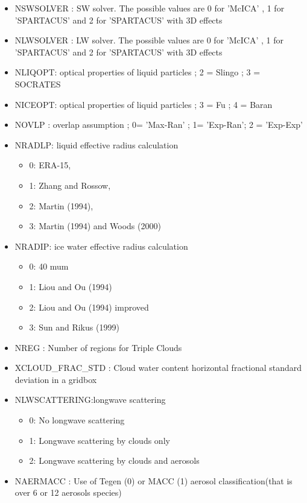 \begin{itemize}
\item NSWSOLVER : SW solver. The possible values are 0 for 'McICA' , 1 for 'SPARTACUS' and 2 for 'SPARTACUS' with 3D effects
\item NLWSOLVER : LW solver. The possible values are 0 for 'McICA' , 1 for 'SPARTACUS' and 2 for 'SPARTACUS' with 3D effects
\item NLIQOPT: optical properties of liquid particles ; 2 = Slingo ; 3 = SOCRATES
\item NICEOPT: optical properties of liquid particles ; 3 = Fu ; 4 = Baran
\item NOVLP :  overlap assumption ; 0= 'Max-Ran' ; 1= 'Exp-Ran'; 2 = 'Exp-Exp'
\item NRADLP: liquid effective radius calculation
	\begin{itemize}
		\item 0: ERA-15, 
		\item 1: Zhang and Rossow,
		\item 2: Martin (1994), 
		\item 3: Martin (1994) and Woods (2000)
	\end{itemize}
\item NRADIP: ice water effective radius calculation
	\begin{itemize}
		\item 0: 40 mum
		\item 1: Liou and Ou (1994)
		\item 2: Liou and Ou (1994) improved
		\item 3: Sun and Rikus (1999)
	\end{itemize}
\item NREG : Number of regions for Triple Clouds
\item XCLOUD\_FRAC\_STD :  Cloud water content horizontal fractional standard deviation in a gridbox
\item NLWSCATTERING:longwave scattering
\begin{itemize}
\item 0: No longwave scattering
\item 1: Longwave scattering by clouds only
\item 2: Longwave scattering by clouds and aerosols
\end{itemize}

\item NAERMACC :  Use of Tegen (0) or MACC (1) aerosol classification(that is over 6 or 12 aerosols species)

\end{itemize}

